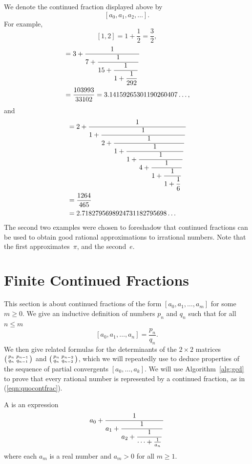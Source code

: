 We denote the continued fraction displayed above by
$$
  [a_0,a_1,a_2,\ldots].
$$
For example,
$$[1,2] = 1+\frac{1}{2} = \frac{3}{2},$$
\begin{align*}
[3, 7, 15, 1, 292 ] &= 3 + \frac{1}{\ds 7+ \frac{1}{\ds 15+\frac{1}{\ds 1+\frac{1}{292}}}}\\
 &= \frac{103993}{33102}=3.14159265301190260407\ldots,
\end{align*}
and
\begin{align*}
[2, 1, 2, 1, 1, 4, 1, 1, 6] &=
  2 + \frac{1}{\ds 1 +\frac{1}{\ds 2 +\frac{1}{\ds 1 + \frac{1}{\ds 1 + \frac{1}{\ds 4 + \frac{1}{\ds 1 + \frac{1}{\ds 1 + \frac{1}{\ds 6}}}}}}}} \\
  &= \frac{1264}{465} \\
  &= 2.7182795698924731182795698\ldots
\end{align*}
The second two examples were chosen to foreshadow that continued
fractions can be used to obtain good rational approximations to
irrational numbers.  Note that the first approximates~$\pi$,
and the second~$e$.



\section{Finite Continued Fractions}\label{sec:finitecontfrac}
This section is about continued fractions of
the form $[a_0,a_1,\ldots, a_m]$ for some $m\geq 0$.
We give an inductive definition of numbers $p_n$ and $q_n$
such that for all $n\leq m$
\begin{equation}\label{eqn:quocontfrac}
  [a_0,a_1,\ldots,a_n] = \frac{p_n}{q_n}.
\end{equation}
We then give related formulas for
the determinants of the $2\times 2$
matrices $\left(\begin{smallmatrix}p_n&p_{n-1}\\q_n&q_{n-1} \end{smallmatrix}\right)$ and
$\left(\begin{smallmatrix}p_n&p_{n-2}\\q_n&q_{n-2} \end{smallmatrix}\right)$,  which we will repeatedly use to
deduce properties of the sequence of partial convergents
$[a_0,\ldots,a_k]$.
We will use Algorithm~\ref{alg:gcd} to prove that every
rational number is represented by a continued fraction, as in
(\ref{eqn:quocontfrac}).

\begin{definition}
A  is an expression
$$
    a_0 + \frac{1}{\displaystyle a_1+\frac{1}{\displaystyle a_2 +
         \displaystyle \frac{1}{ \cdots +\frac{1}{a_n}}}}
$$
where each $a_m$ is a real number and $a_m>0$ for all $m\geq 1$.
\end{definition}

